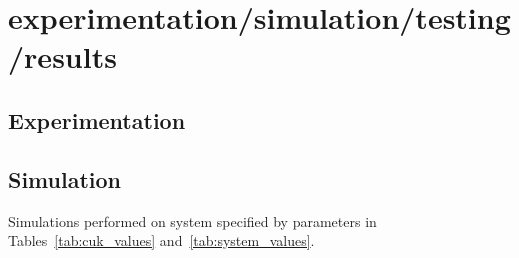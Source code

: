 \section{experimentation/simulation/testing/results}
\subsection{Experimentation}
\subsection{Simulation}
Simulations performed on system specified by parameters in Tables~\ref{tab:cuk_values} and~\ref{tab:system_values}.
